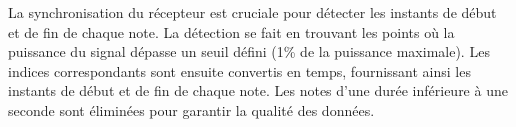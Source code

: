 La synchronisation du récepteur est cruciale pour détecter les instants de début et de fin de chaque note. La détection se fait en trouvant les points où la puissance du signal dépasse un seuil défini (1\% de la puissance maximale). Les indices correspondants sont ensuite convertis en temps, fournissant ainsi les instants de début et de fin de chaque note. Les notes d'une durée inférieure à une seconde sont éliminées pour garantir la qualité des données. 